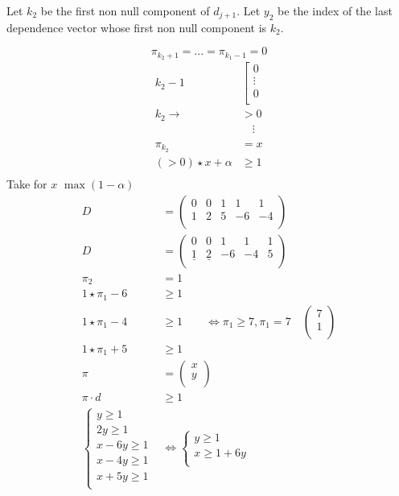 \documentclass{article}
\begin{document}
Let $k_2$ be the first non null component of $d_{j+1}$. Let $y_2$ be the index of the last dependence vector whose first non null component is $k_2$.

\[\pi_{k_{2}+1}=...=\pi_{k_1-1}=0\]
\begin{align*}
k_{2}-1 & \left[ \begin{matrix}
0\\
\vdots\\
0\\
\end{matrix} \right.\\
k_2 \to & >0\\
&\quad \vdots\\
\\
\pi_{k_2}&=x\\
(>0)\star x +\alpha & \geq 1 \tag{scalar product}\\
\end{align*}
Take for $x$ $\max(1-\alpha)$
\begin{align*}
D&=\begin{pmatrix}
0&0&1&1&1\\
1&2&5&-6&-4\\
\end{pmatrix}\\
D&=\begin{pmatrix}
0&0&1&1&1\\
\underline{1}&\underline{2}&-6&-4&5\\
\end{pmatrix}\\
\pi_2 & = 1\\
1\star \pi_1-6&\geq 1\\
1\star \pi_1 - 4 &\geq 1 \qquad \Leftrightarrow \pi_1 \geq 7, \pi_1 = 7 \quad \begin{pmatrix}
7\\1\\
\end{pmatrix}\\
1\star \pi_1 + 5 &\geq 1\\
\pi& = \begin{pmatrix}
x\\y\\
\end{pmatrix}\\
\pi \cdot d &\geq 1\\
\begin{cases}
y\geq 1\\
2y\geq 1\\
x-6y\geq 1\\
x-4y\geq 1\\
x+5y\geq 1\\
\end{cases}
& \Leftrightarrow
\begin{cases}
y\geq 1\\
x\geq 1 + 6y\\
\end{cases}
\end{align*}
\end{document}

